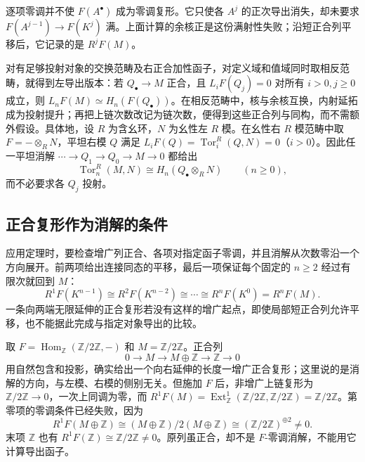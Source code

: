 逐项零调并不使 \(F(A^\bullet)\) 成为零调复形。它只使各 \(A^j\) 的正次导出消失，却未要求 \(F(A^{j-1})\to F(K^j)\) 满。上面计算的余核正是这份满射性失败；沿短正合列平移后，它记录的是 \(R^jF(M)\)。

\ProseParagraphBreak
对有足够投射对象的交换范畴及右正合加性函子，对定义域和值域同时取相反范畴，就得到左导出版本：若 \(Q_\bullet\to M\) 正合，且 \(L_iF(Q_j)=0\) 对所有 \(i>0,j\ge0\) 成立，则 \(L_nF(M)\simeq H_n(F(Q_\bullet))\)。在相反范畴中，核与余核互换，内射延拓成为投射提升；再把上链次数改记为链次数，便得到这些正合列与同构，而不需额外假设。具体地，设 \(R\) 为含幺环，\(N\) 为幺性左 \(R\) 模。在幺性右 \(R\) 模范畴中取 \(F=-\otimes_RN\)，平坦右模 \(Q\) 满足 \(L_iF(Q)=\operatorname{Tor}_i^R(Q,N)=0\)（\(i>0\)）。因此任一平坦消解 \(\cdots\to Q_1\to Q_0\to M\to0\) 都给出
\[
	\operatorname{Tor}_n^R(M,N)\cong H_n(Q_\bullet\otimes_RN) \qquad(n\ge0),
\]
而不必要求各 \(Q_j\) 投射。

\subsection{正合复形作为消解的条件}
\label{b4:subsec:1003:03}

应用定理时，要检查增广列正合、各项对指定函子零调，并且消解从次数零沿一个方向展开。前两项给出连接同态的平移，最后一项保证每个固定的 \(n\ge2\) 经过有限次就回到 \(M\)：
\[
	R^1F(K^{n-1})\cong R^2F(K^{n-2})\cong\cdots\cong R^nF(K^0) =R^nF(M).
\]
一条向两端无限延伸的正合复形若没有这样的增广起点，即使局部短正合列允许平移，也不能据此完成与指定对象导出的比较。

\begin{example}\label{b4:exm:arbitrary-resolution-fails}
	取 \(F=\operatorname{Hom}_{\mathbb Z}(\mathbb Z/2\mathbb Z,-)\) 和 \(M=\mathbb Z/2\mathbb Z\)。正合列
	\[
		0\longrightarrow M\longrightarrow M\oplus\mathbb Z \longrightarrow\mathbb Z\longrightarrow0
	\]
	用自然包含和投影，确实给出一个向右延伸的长度一增广正合复形；这里说的是消解的方向，与左模、右模的侧别无关。但施加 \(F\) 后，非增广上链复形为 \(\mathbb Z/2\mathbb Z\to0\)，一次上同调为零，而 \(R^1F(M)=\operatorname{Ext}_{\mathbb Z}^1(\mathbb Z/2\mathbb Z,\mathbb Z/2\mathbb Z)=\mathbb Z/2\mathbb Z\)。第零项的零调条件已经失败，因为
	\[
		R^1F(M\oplus\mathbb Z) \cong (M\oplus\mathbb Z)/2(M\oplus\mathbb Z) \cong (\mathbb Z/2\mathbb Z)^{\oplus2}\ne0.
	\]
	末项 \(\mathbb Z\) 也有 \(R^1F(\mathbb Z)\cong\mathbb Z/2\mathbb Z\ne0\)。原列虽正合，却不是 \(F\)-零调消解，不能用它计算导出函子。
\end{example}

